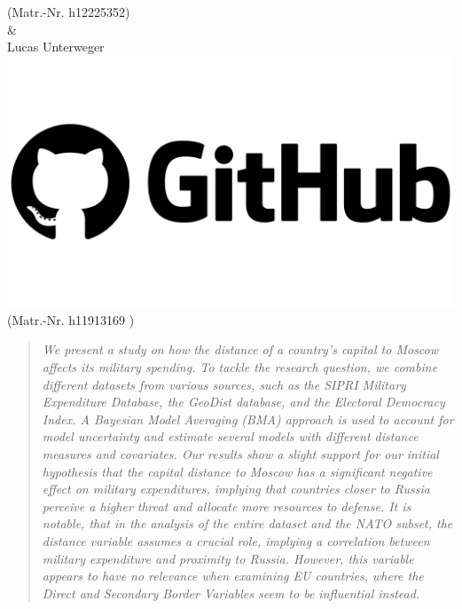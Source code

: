 \documentclass[12pt,a4paper]{article}
\begin{document}
\begin{titlepage}
(Matr.-Nr. h12225352)\\ \vspace{3mm}
\& \\ \vspace{3mm}
{\Large Lucas Unterweger \href{https://github.com/therealLucasPaul}{\includegraphics[scale=0.01]{GitHub.png}}}\\
(Matr.-Nr. h11913169 )\\ \vspace{3mm}
\vfill

\thispagestyle{empty}
\pagebreak
\end{titlepage}
\thispagestyle{empty}
\begin{abstract}
\textit{We present a study on how the distance of a country’s capital to Moscow affects its military spending. To tackle the research question, we combine different datasets from various sources, such as the SIPRI Military Expenditure Database, the GeoDist database, and the Electoral Democracy Index. A Bayesian Model Averaging (BMA) approach is used to account for model uncertainty and estimate several models with different distance measures and covariates. Our results show a slight support for our initial hypothesis that the capital distance to Moscow has a significant negative effect on military expenditures, implying that countries closer to Russia perceive a higher threat and allocate more resources to defense. 
It is notable, that in the analysis of the entire dataset and the NATO subset, the distance variable assumes a crucial role, implying a correlation between military expenditure and proximity to Russia. However, this variable appears to have no relevance when examining EU countries, where the Direct and Secondary Border Variables seem to be influential instead. } 
\end{abstract}
\clearpage
\thispagestyle{plain}
\tableofcontents
\pagebreak
{}
\end{document}
